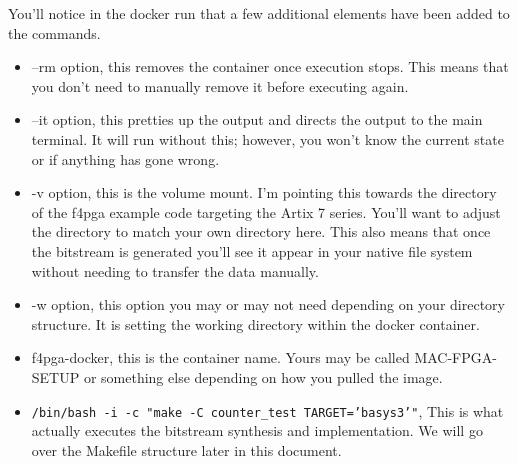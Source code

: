 You'll notice in the docker run that a few additional elements have been added to the commands.
\begin{itemize}
    \item --rm option, this removes the container once execution stops. 
    This means that you don't need to manually remove it before executing again.

    \item --it option, this pretties up the output and directs the output to the main terminal. 
    It will run without this; however, you won't know the current state or if anything has gone wrong. 

    \item -v option, this is the volume mount. I'm pointing this towards the directory of the f4pga example code targeting the Artix 7 series. 
    You'll want to adjust the directory to match your own directory here. 
    This also means that once the bitstream is generated you'll see it appear in your native file system without needing to transfer the data manually. 

    \item -w option, this option you may or may not need depending on your directory structure. It is setting the working directory within the docker container. 

    \item f4pga-docker, this is the container name. Yours may be called MAC-FPGA-SETUP or something else depending on how you pulled the image.

    \item \texttt{/bin/bash -i -c "make -C counter\_test TARGET='basys3'"}, 
    This is what actually executes the bitstream synthesis and implementation. We will go over the Makefile structure later in this document.

\end{itemize}